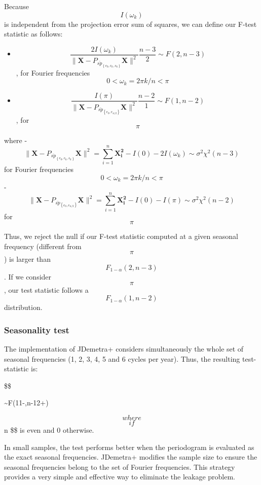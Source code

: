 \documentclass[
  letterpaper,
  DIV=11,
  numbers=noendperiod]{scrreprt}
\providecommand{\tightlist}{%
  \setlength{\itemsep}{0pt}\setlength{\parskip}{0pt}}\usepackage{longtable,booktabs,array}
\begin{document}
Because \[ I(\omega_{k}) \] is independent from the projection error sum
of squares, we can define our F-test statistic as follows:

\begin{itemize}
\tightlist
\item
  \[ \frac{ 2I(\omega_{k})}{\|\mathbf{X}-P_{\bar{sp}_{\left\{ e_0,c_{k},s_{k} \right\}}} \mathbf{X}\|^2} \frac{n-3}{2} \sim F(2,n-3) \],
  for Fourier frequencies \[ 0 < \omega_{k}=2\pi k/n < \pi \]
\item
  \[ \frac{ I(\pi)}{\|\mathbf{X}-P_{\bar{sp}_{\left\{ e_0,e_{n/2} \right\}}} \mathbf{X}\|^2} \frac{n-2}{1} \sim F(1,n-2)\],
  for \[ \pi \]
\end{itemize}

where -
\[ \|\mathbf{X}-P_{\bar{sp}_{\left\{ e_0,c_{k},s_{k} \right\}}} \mathbf{X}\|^2  = \sum_{i=1}^{n}\mathbf{X^2_i}-I(0)-2I(\omega_{k}) \sim \sigma^{2} \chi^{2}(n-3)\]
for Fourier frequencies \[ 0 < \omega_{k}=2\pi k/n < \pi \] -
\[ \|\mathbf{X}-P_{\bar{sp}_{\left\{ e_0,e_{n/2} \right\}}} \mathbf{X}\|^2 = \sum_{i=1}^{n}\mathbf{X^2_i}-I(0)-I(\pi) \sim \sigma^{2} \chi^{2}(n-2)  \]
for \[ \pi \]

Thus, we reject the null if our F-test statistic computed at a given
seasonal frequency (different from \[ \pi \]) is larger than
\[ F_{1-α}(2,n-3)\]. If we consider \[ \pi  \], our test statistic
follows a \[ F_{1-α}(1,n-2)\] distribution.

\hypertarget{seasonality-test}{%
\subsubsection{Seasonality test}\label{seasonality-test}}

The implementation of JDemetra+ considers simultaneously the whole set
of seasonal frequencies (1, 2, 3, 4, 5 and 6 cycles per year). Thus, the
resulting test-statistic is:

\$\$

 \sim F(11-\delta,n-12+\delta)

\[ where \]  \[ if \] n \$\$ is even and 0 otherwise.

In small samples, the test performs better when the periodogram is
evaluated as the exact seasonal frequencies. JDemetra+ modifies the
sample size to ensure the seasonal frequencies belong to the set of
Fourier frequencies. This strategy provides a very simple and effective
way to eliminate the leakage problem.
\end{document}
